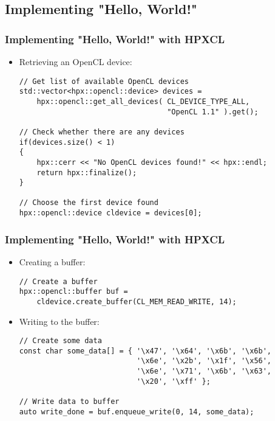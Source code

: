 \documentclass{beamer}
\begin{document}
\subsection{Implementing "Hello, World!"}
\begin{frame}[fragile]
    \frametitle{Implementing "Hello, World!" with HPXCL}
    \begin{itemize}
        \item Retrieving an OpenCL device:
        \begin{lstlisting}[firstnumber=30]
// Get list of available OpenCL devices
std::vector<hpx::opencl::device> devices =
    hpx::opencl::get_all_devices( CL_DEVICE_TYPE_ALL,
                                  "OpenCL 1.1" ).get();

// Check whether there are any devices
if(devices.size() < 1)
{
    hpx::cerr << "No OpenCL devices found!" << hpx::endl;
    return hpx::finalize();
}

// Choose the first device found
hpx::opencl::device cldevice = devices[0];
        \end{lstlisting}
    \end{itemize}
\end{frame}

\begin{frame}[fragile]
    \frametitle{Implementing "Hello, World!" with HPXCL}
    \begin{itemize}
        \item Creating a buffer:
        \begin{lstlisting}[firstnumber=40]
// Create a buffer
hpx::opencl::buffer buf =
    cldevice.create_buffer(CL_MEM_READ_WRITE, 14);
        \end{lstlisting}
        \item Writing to the buffer:
        \begin{lstlisting}[firstnumber=44]
// Create some data
const char some_data[] = { '\x47', '\x64', '\x6b', '\x6b',
                           '\x6e', '\x2b', '\x1f', '\x56',
                           '\x6e', '\x71', '\x6b', '\x63',
                           '\x20', '\xff' };

// Write data to buffer
auto write_done = buf.enqueue_write(0, 14, some_data);
        \end{lstlisting}
    \end{itemize}
\end{frame}
\end{document}

